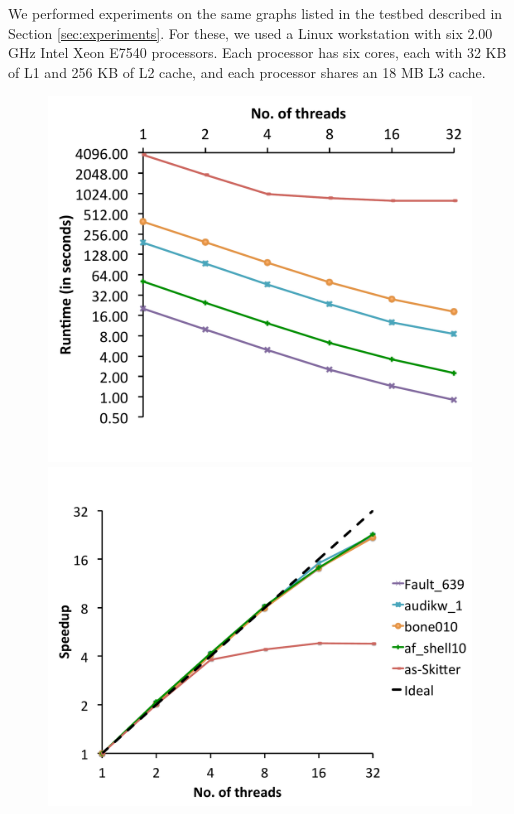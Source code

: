 We performed experiments on the same graphs listed in the testbed described in Section \ref{sec:experiments}. For these, we used a Linux workstation 
with six 2.00 GHz Intel Xeon E7540 processors. Each processor has six cores, each with 32 KB of L1 and 256 KB of L2 cache, and each processor shares an 18 MB L3 cache.  


\begin{figure}
  \centering
    \includegraphics[scale=0.17]{parallel_realworld_timing.pdf}
    \includegraphics[scale=0.17]{parallel_realworld_speedup.pdf}

\end{figure}
